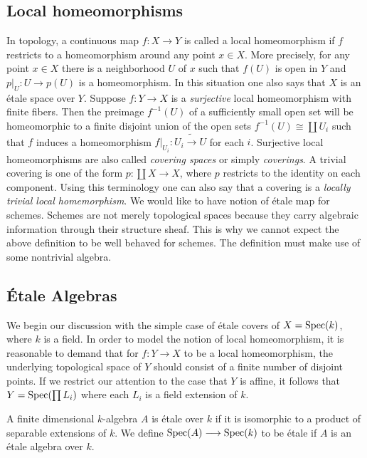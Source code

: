\subsection{Local homeomorphisms}
In topology, a continuous map $f: X \to Y$ is called a local homeomorphism if $f$ restricts to a homeomorphism around any point $x \in X$. More precisely, for any point $x \in X$ there is a neighborhood $U$ of $x$ such that $f(U)$ is open in $Y$ and $p|_U: U \to p(U)$ is a homeomorphism. In this situation one also says that $X$ is an \'etale space over $Y$. Suppose $f: Y \to X$ is a \textit{surjective} local homeomorphism with finite fibers. Then the preimage $f^{-1}(U)$ of a sufficiently small open set will be homeomorphic to a finite disjoint union of the open sets $f^{-1}(U) \cong \coprod U_i$ such that $f$ induces a homeomorphism $f|_{U_i} : U_i \tilde{\to} U$ for each $i$. Surjective local homeomorphisms are also called \textit{covering spaces} or simply \textit{coverings}. A trivial covering is one of the form $p: \coprod X \to X$, where $p$ restricts to the identity on each component. Using this terminology one can also say that a covering is a \textit{locally trivial local homemorphism}.
We would like to have notion of \'etale map for schemes. Schemes are not merely topological spaces because they carry algebraic information through their structure sheaf. This is why we cannot expect the above definition to be well behaved for schemes. The definition must make use of some nontrivial algebra. 

\subsection{\'Etale Algebras}
We begin our discussion with the simple case of \'etale covers of $X = \operatorname{Spec}(k)$, where $k$ is a field. In order to model the notion of local homeomorphism, it is reasonable to demand that for $f: Y \to X$ to be a local homeomorphism,  the underlying topological space of $Y$ should consist of a finite number of disjoint points. If we restrict our attention to the case that $Y$ is affine, it follows that $Y = \operatorname{Spec}(\prod L_i)$ where each $L_i$ is a field extension of $k$. 

\begin{definition}
  A finite dimensional $k$-algebra $A$ is \'etale over $k$ if it is isomorphic to a product of separable extensions of $k$. We define $\operatorname{Spec}(A) \longrightarrow \operatorname{Spec}(k)$ to be \'etale if $A$ is an \'etale algebra over $k$.
\end{definition}


